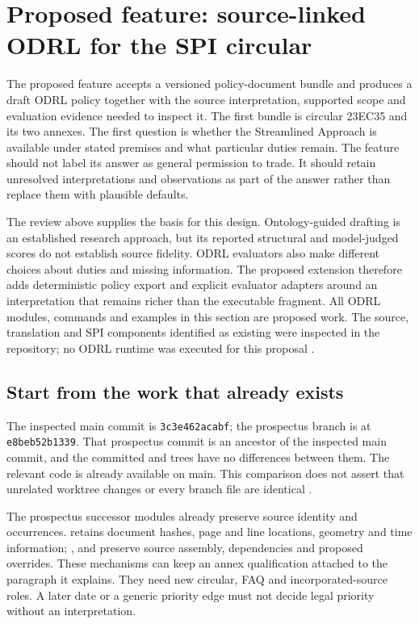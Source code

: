 \section{Proposed feature: source-linked ODRL for the SPI circular}
\label{sec:odrl-proposal}

The proposed feature accepts a versioned policy-document bundle and produces
a draft ODRL policy together with the source interpretation, supported scope
and evaluation evidence needed to inspect it. The first bundle is circular
23EC35 and its two annexes. The first question is whether the Streamlined
Approach is available under stated premises and what particular duties remain.
The feature should not label its answer as general permission to trade.
It should retain unresolved interpretations and observations as part of the
answer rather than replace them with plausible defaults.

The review above supplies the basis for this design. Ontology-guided drafting
is an established research approach, but its reported structural and
model-judged scores do not establish source fidelity. ODRL evaluators also make
different choices about duties and missing information. The proposed extension
therefore adds deterministic policy export and explicit evaluator adapters
around an interpretation that remains richer than the executable fragment.
All ODRL modules, commands and examples in this section are proposed work.
The source, translation and SPI components identified as existing were
inspected in the repository; no ODRL runtime was executed for this proposal
\citep{hkmaodrlsurvey2026,hkmaodrlsoftware2026}.

\subsection{Start from the work that already exists}

The inspected main commit is \texttt{3c3e462acabf}; the prospectus branch
 is at \texttt{e8beb52b1339}.
That prospectus commit is an ancestor of the inspected main commit, and the
committed  and
 trees have no differences between them.
The relevant code is already available on main. This comparison does not
assert that unrelated worktree changes or every branch file are identical
\citep{hkmaodrlsoftware2026}.

The prospectus successor modules already preserve source identity and
occurrences.  retains document hashes, page and line
locations, geometry and time information; ,
 and  preserve source assembly,
dependencies and proposed overrides. These mechanisms can keep an annex
qualification attached to the paragraph it explains. They need new circular,
FAQ and incorporated-source roles. A later date or a generic priority edge
must not decide legal priority without an interpretation.

